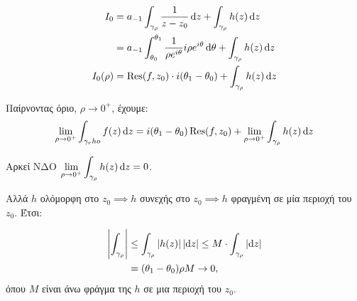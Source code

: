 \documentclass[12pt,a4paper,notitlepage,fleqn]{article}
\begin{document}
    \begin{align*}
    	I_0 &= a_{-1} \int_{\gamma_\rho} \frac{1}{z-z_0}\mathop{}\!\mathrm{d} z + \int_{\gamma_\rho}
    	h(z)\mathop{}\!\mathrm{d} z \\ &= a_{-1} \int_{\theta_0}^{\theta_1} \frac{1}{\rho e^{i\theta}}
    	i\rho e^{i\theta}\mathop{}\!\mathrm{d} \theta + \int_{\gamma_\rho} h(z) \mathop{}\!\mathrm{d} z \\
    	I_0(\rho) &= \operatorname{Res}(f,z_0) \cdot i (\theta_1 - \theta_0) + \int_{\gamma_\rho} h(z)
    	\mathop{}\!\mathrm{d} z
    \end{align*}

    Παίρνοντας όριο, \( \rho\to 0^+ \), έχουμε:
    \[
    \lim_{\rho\to 0^+} \int_{\gamma_rho} f(z)\mathop{}\!\mathrm{d} z = i(\theta_1-\theta_0)\operatorname{Res}(f,z_0)
    + \lim_{\rho\to 0^+} \int_{\gamma_\rho} h(z)\mathop{}\!\mathrm{d} z
    \]

    Αρκεί ΝΔΟ \( \displaystyle \lim_{\rho\to 0^+} \int_{\gamma_\rho} h(z)\mathop{}\!\mathrm{d} z = 0 \).

    Αλλά \( h \) ολόμορφη στο \( z_0 \implies h \) συνεχής στο \( z_0 \implies h \)
    φραγμένη σε μία περιοχή του \( z_0 \). Έτσι:

    \begin{align*}
    	\left| \int_{\gamma_\rho} \right|
    	&\leq \int_{\gamma_\rho} \left|h(z)\right|\left|\mathop{}\!\mathrm{d} z\right|
    	\leq M \cdot \int_{\gamma_\rho} \left|\mathop{}\!\mathrm{d} z\right|
    	\\ &= (\theta_1 - \theta_0) \rho M \to 0,
    \end{align*}
    όπου \( M \) είναι άνω φράγμα της \( h \) σε μια περιοχή του \( z_0 \).

\end{document}
